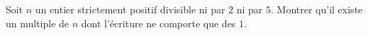 Soit $n$ un entier strictement positif divisible ni par $2$ ni par $5$. Montrer qu'il existe un multiple de $n$ dont l'écriture ne comporte que des $1$.
